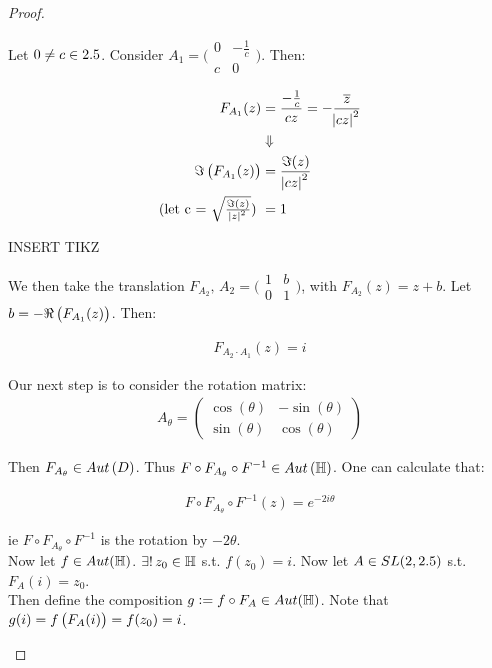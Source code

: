 \begin{proof}
\begin{enumerate}
    Let $0 \neq c \in 2.5$. Consider $A_1 = \big(\begin{smallmatrix}
  0 & -\frac{1}{c}\\
  c & 0
\end{smallmatrix}\big)$. Then:

\begin{align*}
    F_{A_1} (z) &= \frac{-\frac{1}{c}}{cz} = - \frac{\overline{z}}{\abs{cz}^2}\\
   &\Downarrow\\
    \Im \left( F_{A_1} (z) \right) &= \frac{\Im (z)}{\abs{cz}^2}\\
    \text{(let c = $\sqrt{\tfrac{\Im (z)}{\abs{z}^2}}$) } &= 1
\end{align*}

INSERT TIKZ

We then take the translation $F_{A_2}, \, A_2 = \big(\begin{smallmatrix}
  1 & b\\
  0 & 1
\end{smallmatrix}\big)$, with $F_{A_2} (z) = z+b$. Let $b = - \Re \left( F_{A_1} (z) \right)$. Then:

\begin{align*}
    F_{A_2 \cdot A_1} (z) = i
\end{align*}

Our next step is to consider the rotation matrix:
\begin{align*}
    A_\theta = \begin{pmatrix}
  \cos(\theta) & -\sin( \theta)\\
  \sin (\theta) & \cos ( \theta)
\end{pmatrix}
\end{align*}

Then $F_{A_\theta} \in Aut \left( D \right)$. Thus $F \circ F_{A_\theta} \circ F^{-1} \in Aut \left( \mathbb{H} \right)$. One can calculate that:

\begin{align*}
    F \circ F_{A_\theta} \circ F^{-1} (z)= e^{-2 i \theta}
\end{align*}

ie $F \circ F_{A_\theta} \circ F^{-1}$ is the rotation by $-2 \theta$.\\

Now let $f \in Aut ( \mathbb{H})$. $\exists !  \, z_0 \in \mathbb{H}$ s.t. $f(z_0) = i$. Now let $A \in SL(2,2.5) $ s.t. $F_A (i) = z_0$.\\

Then define the composition $g \vcentcolon = f \circ F_A  \in Aut ( \mathbb{H})$. Note that $g(i) = f \left( F_A ( i)  \right) = f(z_0) = i$.\\


\end{enumerate}
\end{proof}
